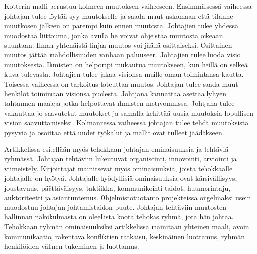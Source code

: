 \documentclass[finnish]{tktltiki2}
\theoremstyle{definition}
\theoremstyle{remark}
\begin{document}
Kotterin malli perustuu kolmeen muutoksen vaiheeseen. Ensimmäisessä vaiheessa johtajan tulee löytää syy muutokselle ja saada muut uskomaan että tilanne muutkosen jälkeen on parempi kuin ennen muutosta. Johtajien tulee yhdessä muodostaa liittouma, jonka avulla he voivat ohjeistaa muutosta oikeaan suuntaan. Ilman yhtenäistä linjaa muutos voi jäädä osittaiseksi. Osittainen muutos jättää mahdollisuuden vanhaan paluuseen. Johtajien tulee luoda visio muutoksesta. Ihmisten on helpompi mukautua muutokseen, kun heillä on selkeä kuva tulevasta. Johtajien tulee jakaa visionsa muille oman toimintansa kautta. Toisessa vaiheessa on tarkoitus toteuttaa muutos. Johtajan tulee saada muut henkilöt toimimaan visionsa puolesta. Johtjana kannattaa asettaa lyhyen tähtäimen maaleja jotka helpottavat  ihmisten motivoinnissa. Johtjana tulee vakauttaa jo saavutetut muutokset ja samalla kehittää uusia muutoksia lopullisen vision saavuttamiseksi.  Kolmannessa vaiheessa johtajan tulee tehdä muutoksista pysyviä ja osoittaa että uudet työkalut ja mallit ovat tulleet jäädäkseen. 

Artikkelissa esitellään myös tehokkaan johtajan ominaisuuksia ja tehtäviä ryhmässä. Johtajan tehtäviin lukeutuvat organisointi, innovointi, arviointi ja viimeistely. Kirjoittajat mainitsevat myös ominaisuuksia, joista tehokkaalle johtajalle on hyötyä. Johtajalle hyödyllisiä ominaisuuksia ovat kärsivällisyys, joustavuus, päättäväisyys, taktiikka, kommunikointi taidot, huumorintaju, auktoriteetti ja asiantuntemus. Ohjelmistotuotanto projekteissa ongelmaksi usein muodostuu johtajan johtamistaidon puute. Johtajan tehtäviin muutosten hallinnan näkökulmasta on oleellista koota tehokas ryhmä, jota hän johtaa. Tehokkaan ryhmän ominaisuuksiksi artikkelissa mainitaan yhteinen maali, avoin kommunikaatio, rakentava konfliktien ratkaisu, keskinäinen luottamus, ryhmän henkilöiden välinen tukeminen ja luottamus.


%
%
% 
%



\end{document}
